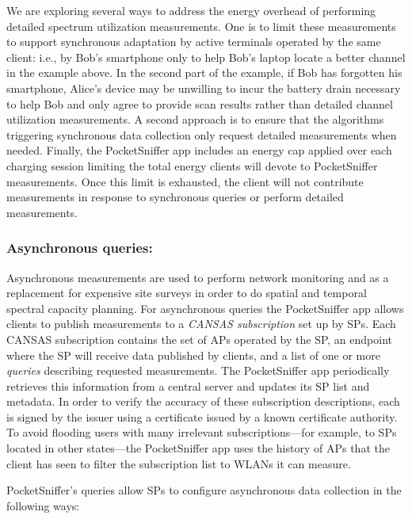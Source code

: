 We are exploring several ways to address the energy overhead of performing
detailed spectrum utilization measurements. One is to limit these
measurements to support synchronous adaptation by active terminals operated
by the same client: i.e., by Bob's smartphone only to help Bob's laptop
locate a better channel in the example above. In the second part of the
example, if Bob has forgotten his smartphone, Alice's device may be unwilling
to incur the battery drain necessary to help Bob and only agree to provide
scan results rather than detailed channel utilization measurements. A second
approach is to ensure that the algorithms triggering synchronous data
collection only request detailed measurements when needed. Finally, the
PocketSniffer app includes an energy cap applied over each charging session
limiting the total energy clients will devote to PocketSniffer measurements.
Once this limit is exhausted, the client will not contribute measurements in
response to synchronous queries or perform detailed measurements.

\subsubsection{Asynchronous queries:\space} Asynchronous measurements are
used to perform network monitoring and as a replacement for expensive site
surveys in order to do spatial and temporal spectral capacity planning. For
asynchronous queries the PocketSniffer app allows clients to publish
measurements to a \textit{CANSAS subscription} set up by SPs. Each CANSAS
subscription contains the set of APs operated by the SP, an endpoint where
the SP will receive data published by clients, and a list of one or more
\textit{queries} describing requested measurements. The PocketSniffer app
periodically retrieves this information from a central server and updates its
SP list and metadata. In order to verify the accuracy of these subscription
descriptions, each is signed by the issuer using a certificate issued by a
known certificate authority. To avoid flooding users with many irrelevant
subscriptions---for example, to SPs located in other states---the
PocketSniffer app uses the history of APs that the client has seen to filter
the subscription list to WLANs it can measure.

PocketSniffer's queries allow SPs to configure asynchronous data collection
in the following ways:

